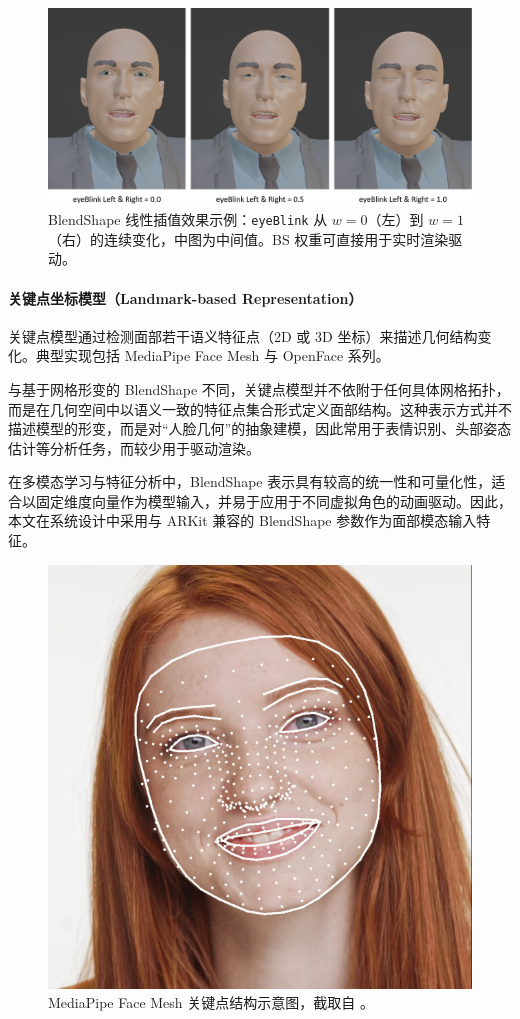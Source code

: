 \begin{figure}[h!t]
\centering
\includegraphics[width=0.95\linewidth]{figures/Fig_blendshapeEyeBlink.png}
\caption{BlendShape 线性插值效果示例：\texttt{eyeBlink} 从 $w{=}0$（左）到 $w{=}1$（右）的连续变化，中图为中间值。BS 权重可直接用于实时渲染驱动。}
\label{fig:bs_eyeblink}
\end{figure}

\paragraph{关键点坐标模型（Landmark-based Representation）}
关键点模型通过检测面部若干语义特征点（2D 或 3D 坐标）来描述几何结构变化。典型实现包括 MediaPipe Face Mesh \cite{mediapipefacemesh} 与 OpenFace 系列。

与基于网格形变的 BlendShape 不同，关键点模型并不依附于任何具体网格拓扑，而是在几何空间中以语义一致的特征点集合形式定义面部结构。这种表示方式并不描述模型的形变，而是对“人脸几何”的抽象建模，因此常用于表情识别、头部姿态估计等分析任务，而较少用于驱动渲染。

在多模态学习与特征分析中，BlendShape 表示具有较高的统一性和可量化性，适合以固定维度向量作为模型输入，并易于应用于不同虚拟角色的动画驱动。因此，本文在系统设计中采用与 ARKit 兼容的 BlendShape 参数作为面部模态输入特征。

\begin{figure}[h!t]
\centering
\includegraphics[width=0.4\linewidth]{figures/Fig_MediaPipeLandmark.png}
\caption{MediaPipe Face Mesh 关键点结构示意图，截取自 \cite{mediapipefacemesh}。}
\label{fig_mediapipe_landmark}
\end{figure}

